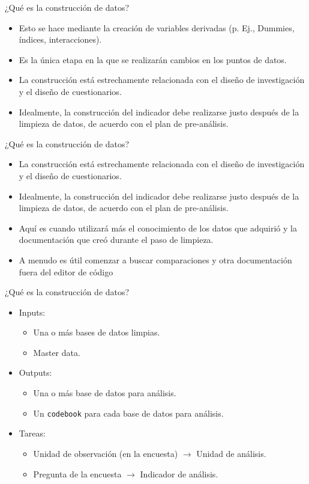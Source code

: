 \documentclass[10pt, aspectratio=169, compress]{beamer}
\begin{document}
\begin{frame}[t]{¿Qué es la construcción de datos?}
	\begin{itemize}
		\item Esto se hace mediante la creación de variables derivadas (p. Ej., Dummies, índices, interacciones).
		\item Es la única etapa en la que se realizarán cambios en los puntos de datos.
		\item La construcción está estrechamente relacionada con el diseño de investigación y el diseño de cuestionarios.
		\item Idealmente, la construcción del indicador debe realizarse justo después de la limpieza de datos, de acuerdo con el plan de pre-análisis. 
	\end{itemize}
\end{frame}
\begin{frame}[t]{¿Qué es la construcción de datos?}
	\begin{itemize}
		\item La construcción está estrechamente relacionada con el diseño de investigación y el diseño de cuestionarios.
		\item Idealmente, la construcción del indicador debe realizarse justo después de la limpieza de datos, de acuerdo con el plan de pre-análisis. 
		\item Aquí es cuando utilizará más el conocimiento de los datos que adquirió y la documentación que creó durante el paso de limpieza.
		\item A menudo es útil comenzar a buscar comparaciones y otra documentación fuera del editor de código
	\end{itemize}
\end{frame}
\begin{frame}[t]{¿Qué es la construcción de datos?}
	\begin{itemize}
		\item Inputs:
		\begin{itemize}
			\item Una o más bases de datos limpias. 
			\item Master data. 
		\end{itemize}
		\item Outputs:
		\begin{itemize}
			\item Una o más base de datos para análisis.
			\item Un \texttt{codebook} para cada base de datos para análisis.
		\end{itemize}
		\item Tareas: 
		\begin{itemize}
			\item Unidad de observación (en la encuesta) $\longrightarrow$ Unidad de análisis.
			\item Pregunta de la encuesta $\longrightarrow$ Indicador de análisis.
		\end{itemize}
	\end{itemize}
\end{frame}
\end{document}
